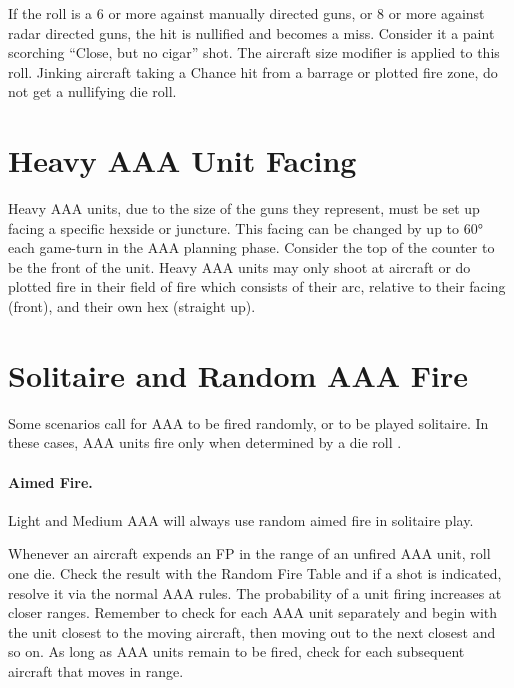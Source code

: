 \begin{advancedrules}
If the roll is a 6 or more against manually directed guns, or 8 or more against radar directed guns, the hit is nullified and becomes a miss. Consider it a paint scorching “Close, but no cigar” shot. The aircraft size modifier is applied to this roll. Jinking aircraft taking a Chance hit from a barrage or plotted fire zone, do not get a nullifying die roll.

\section{Heavy AAA Unit Facing}
\label{rule:heavy-aaa-unit-facing}

Heavy AAA units, due to the size of the guns they represent, must be set up facing a specific hexside or juncture. This facing can be changed by up to 60° each game-turn in the AAA planning phase. Consider the top of the counter to be the front of the unit. Heavy AAA units may only shoot at aircraft or do plotted fire in their field of fire which consists of their  arc, relative to their facing (front), and their own hex (straight up).

\section{Solitaire and Random AAA Fire}




Some scenarios call for AAA to be fired randomly, or to be played solitaire. In these cases, AAA units fire only when determined by a die roll .

\paragraph{Aimed Fire.} Light and Medium AAA will always use random aimed fire in solitaire play.

Whenever an aircraft expends an FP in the range of an unfired AAA unit, roll one die. Check the result with the Random Fire Table and if a shot is indicated, resolve it via the normal AAA rules. The probability of a unit firing increases at closer ranges. Remember to check for each AAA unit separately and begin with the unit closest to the moving aircraft, then moving out to the next closest and so on. As long as AAA units remain to be fired, check for each subsequent aircraft that moves in range.


\end{advancedrules}
